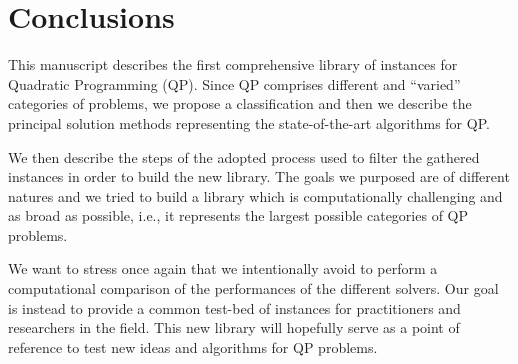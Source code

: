 \section{Conclusions}\label{sec:conclusions}

 This manuscript describes the first comprehensive library of instances for Quadratic Programming (QP). Since QP comprises  different and ``varied'' categories of problems, we propose a classification and then we describe the principal solution methods representing the state-of-the-art algorithms for QP.

We then describe the steps of the adopted process used to filter the gathered instances  in order to build the new library. The goals we purposed are of different natures and we tried to build a library which is computationally challenging and as broad as possible, i.e., it represents the largest possible categories of QP problems. 

We want to stress once again that we intentionally avoid to perform a computational comparison of the performances of the different solvers. Our goal is instead to provide a common test-bed of instances for practitioners and researchers in the field. This new library will hopefully serve as a point of reference to test new ideas and algorithms for QP problems.
